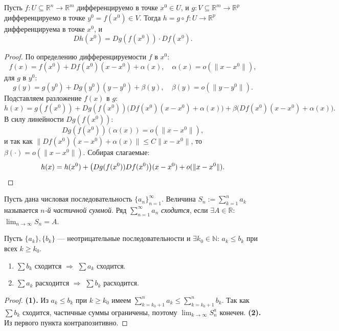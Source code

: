 


\begin{theorem}
Пусть $f: U \subseteq \mathbb{R}^n \to \mathbb{R}^m$ дифференцируемо в точке $x^0 \in U$,
и $g: V \subseteq \mathbb{R}^m \to \mathbb{R}^p$ дифференцируемо в точке $y^0 = f(x^0) \in V$.
Тогда $h = g \circ f: U \to \mathbb{R}^p$ дифференцируема в точке $x^0$, и
\[
Dh(x^0) = Dg(f(x^0)) \cdot Df(x^0).
\]
\begin{proof}
По определению дифференцируемости $f$ в $x^0$:
\[
f(x) = f(x^0) + Df(x^0)(x - x^0) + \alpha(x),\quad \alpha(x) = o(\|x - x^0\|),
\]
для $g$ в $y^0$:
\[
g(y) = g(y^0) + Dg(y^0)(y - y^0) + \beta(y),\quad \beta(y) = o(\|y - y^0\|).
\]
Подставляем разложение $f(x)$ в $g$:
\[
h(x) = g(f(x^0)) + Dg(f(x^0))\bigl(Df(x^0)(x - x^0) + \alpha(x)\bigr)
        + \beta\bigl(Df(x^0)(x-x^0)+\alpha(x)\bigr).
\]
В силу линейности $Dg(f(x^0))$:
\[
Dg(f(x^0))(\alpha(x)) = o(\|x-x^0\|),
\]
и так как $\|Df(x^0)(x-x^0)+\alpha(x)\| \leq C\|x-x^0\|$, то
$\beta(\cdot) = o(\|x-x^0\|)$. Собирая слагаемые:
\[
h(x) = h(x^0) + \bigl(Dg(f(x^0)) Df(x^0)\bigr)(x - x^0) + o(\|x-x^0\|). \qedhere
\]
\end{proof}
\end{theorem}


\begin{defn}
  Пусть дана числовая последовательность $\{a_n\}_{n=1}^\infty$.
  Величина $S_n := \sum_{k=1}^n a_k$ называется \emph{$n$-й частичной суммой}.
  Ряд $\sum_{n=1}^\infty a_n$ \emph{сходится}, если $\exists A \in \mathbb{R}$: $\lim_{n\to\infty} S_n = A$.
\end{defn}

\begin{theorem}
  Пусть $\{a_k\},\{b_k\}$ --- неотрицательные последовательности и $\exists k_0 \in \mathbb{N}$:
  $a_k \leq b_k$ при всех $k \geq k_0$.
  \begin{enumerate}
    \item $\sum b_k$ сходится $\Rightarrow$ $\sum a_k$ сходится.
    \item $\sum a_k$ расходится $\Rightarrow$ $\sum b_k$ расходится.
  \end{enumerate}
  \begin{proof}
    \textbf{(1).} Из $a_k \leq b_k$ при $k \geq k_0$ имеем
    $\sum_{k=k_0+1}^n a_k \leq \sum_{k=k_0+1}^n b_k$.
    Так как $\sum b_k$ сходится, частичные суммы ограничены, поэтому $\lim_{k\to\infty} S_n^a$ конечен.
    \textbf{(2).} Из первого пункта контрапозитивно. \qedhere
  \end{proof}
\end{theorem}

